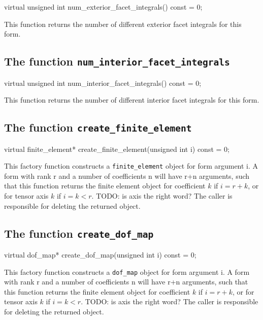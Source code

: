 \begin{code}
virtual unsigned int num_exterior_facet_integrals() const = 0;
\end{code}

This function returns the number of different exterior facet integrals for this form.

\subsection{The function \texttt{num\_interior\_facet\_integrals}}

\begin{code}
virtual unsigned int num_interior_facet_integrals() const = 0;
\end{code}

This function returns the number of different interior facet integrals for this form.

\subsection{The function \texttt{create\_finite\_element}}

\begin{code}
virtual finite_element* create_finite_element(unsigned int i) const = 0;
\end{code}

This factory function constructs a \texttt{finite\_element} object for form argument i.
A form with rank r and a number of coefficients n will have r+n arguments,
such that this function returns the finite element object for coefficient $k$ if $i=r+k$,
or for tensor axis $k$ if $i=k<r$. TODO: is axis the right word?
The caller is responsible for deleting the returned object.

\subsection{The function \texttt{create\_dof\_map}}

\begin{code}
virtual dof_map* create_dof_map(unsigned int i) const = 0;
\end{code}

This factory function constructs a \texttt{dof\_map} object for form argument i.
A form with rank r and a number of coefficients n will have r+n arguments,
such that this function returns the finite element object for coefficient $k$ if $i=r+k$,
or for tensor axis $k$ if $i=k<r$. TODO: is axis the right word?
The caller is responsible for deleting the returned object.

